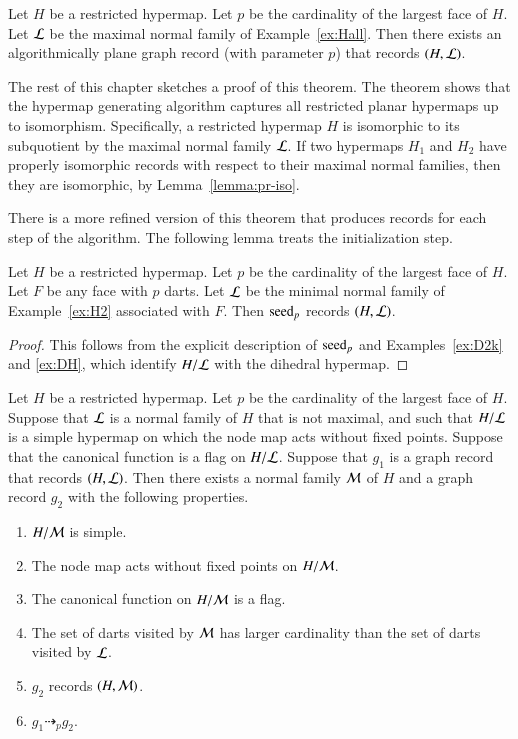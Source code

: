 \begin{theorem}\label{lemma:bn}
  Let $H$ be a restricted hypermap.  Let $p$ be the cardinality of the
  largest face of $H$. Let ${\cal L}$ be the maximal normal family of
  Example~\ref{ex:Hall}.  Then there exists an algorithmically plane
  graph record (with parameter $p$) that records $(H,{\cal L})$.
\end{theorem}

The rest of this chapter sketches a proof of this theorem.
The theorem shows that the hypermap generating algorithm captures all
restricted planar hypermaps up to isomorphism.  Specifically, a
restricted hypermap $H$ is isomorphic to its subquotient by the maximal
normal family ${\cal L}$.  If two hypermaps $H_1$ and $H_2$ have
properly isomorphic records with respect to their maximal normal
families, then they are isomorphic, by Lemma~\ref{lemma:pr-iso}.


There is a more refined version of this theorem that produces records for each
step of the algorithm.  The following lemma treats the initialization step.

\begin{lemma}\label{lemma:algo-init}
  Let $H$ be a restricted hypermap.  Let $p$ be the cardinality of the
  largest face of $H$.  Let $F$ be any face with $p$ darts.  Let
  ${\cal L}$ be the minimal normal family of Example~\ref{ex:H2}
  associated with $F$.  Then ${\operatorname{seed}}_p$ records $(H,{\cal L})$.
\end{lemma}

\begin{proof}
  This follows from the explicit description of ${\operatorname{seed}}_p$ and
  Examples~\ref{ex:D2k} and \ref{ex:DH}, which identify $H/{\cal L}$
  with the dihedral hypermap.
\end{proof}


\begin{lemma}\label{lemma:algo-step}  
  Let $H$ be a restricted hypermap.  Let $p$ be the cardinality of the
  largest face of $H$.  Suppose that ${\cal L}$ is a normal family of
  $H$ that is not maximal, and such that $H/{\cal L}$ is a simple
  hypermap on which the node map acts without fixed points.  Suppose
  that the canonical function is a flag on $H/{\cal L}$.  Suppose that
  $g_1$ is a graph record that records $(H,{\cal L})$.
  Then there exists a normal family ${\cal M}$ of $H$ and a graph
  record $g_2$ with the following properties.
\begin{enumerate}
\item $H/{\cal M}$ is simple.
\item The node map acts without fixed points on $H/{\cal M}$.
\item The canonical function on $H/{\cal M}$ is a flag.
\item The set of darts visited by ${\cal M}$ has larger cardinality than the set of
darts visited by ${\cal L}$.
\item $g_2$ records $(H,{\cal M})$.
\item $g_1 \dashrightarrow_p g_2$.
\end{enumerate}
\end{lemma}


